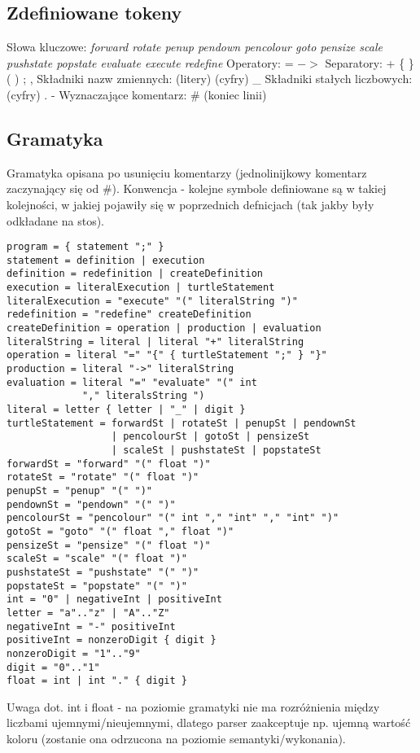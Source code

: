 \documentclass{article}
\begin{document}
\subsection{Zdefiniowane tokeny}
Słowa kluczowe:\newline
\textit{forward rotate penup pendown pencolour goto pensize scale pushstate popstate evaluate execute redefine }\newline
Operatory:\newline
= $-$$>$\newline 
Separatory:\newline
+ \{ \} ( ) ; ,\newline
Składniki nazw zmiennych:\newline
(litery) (cyfry) \_\newline
Składniki stałych liczbowych:\newline
(cyfry) . -\newline
Wyznaczające komentarz:\newline
\# (koniec linii)

\subsection{Gramatyka}
Gramatyka opisana po usunięciu komentarzy (jednolinijkowy komentarz zaczynający się od \#). Konwencja - kolejne symbole definiowane są w takiej kolejności, w jakiej pojawiły się w poprzednich defnicjach (tak jakby były odkładane na stos).
\begin{lstlisting}
program = { statement ";" }
statement = definition | execution
definition = redefinition | createDefinition
execution = literalExecution | turtleStatement
literalExecution = "execute" "(" literalString ")"
redefinition = "redefine" createDefinition
createDefinition = operation | production | evaluation
literalString = literal | literal "+" literalString
operation = literal "=" "{" { turtleStatement ";" } "}"
production = literal "->" literalString
evaluation = literal "=" "evaluate" "(" int
             "," literalsString ")
literal = letter { letter | "_" | digit }
turtleStatement = forwardSt | rotateSt | penupSt | pendownSt  
                  | pencolourSt | gotoSt | pensizeSt
                  | scaleSt | pushstateSt | popstateSt
forwardSt = "forward" "(" float ")"
rotateSt = "rotate" "(" float ")"
penupSt = "penup" "(" ")"
pendownSt = "pendown" "(" ")"
pencolourSt = "pencolour" "(" int "," "int" "," "int" ")"
gotoSt = "goto" "(" float "," float ")"
pensizeSt = "pensize" "(" float ")"
scaleSt = "scale" "(" float ")"
pushstateSt = "pushstate" "(" ")"
popstateSt = "popstate" "(" ")"
int = "0" | negativeInt | positiveInt 
letter = "a".."z" | "A".."Z"
negativeInt = "-" positiveInt
positiveInt = nonzeroDigit { digit }
nonzeroDigit = "1".."9"
digit = "0".."1"
float = int | int "." { digit }

\end{lstlisting}
Uwaga dot. int i float - na poziomie gramatyki nie ma rozróżnienia między liczbami ujemnymi/nieujemnymi, dlatego parser zaakceptuje np. ujemną wartość koloru (zostanie ona odrzucona na poziomie semantyki/wykonania).
\end{document}
